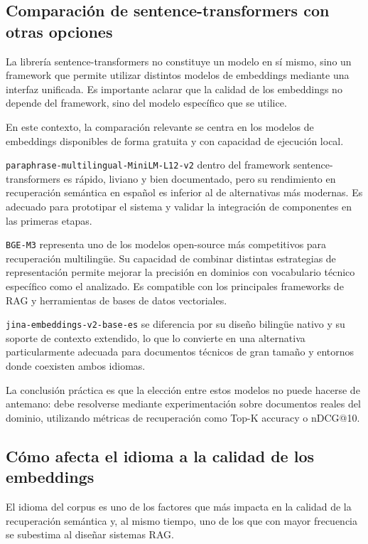 \documentclass[12pt, a4paper]{report}
\begin{document}
\subsection*{Comparación de sentence-transformers con otras opciones}

La librería sentence-transformers no constituye un modelo en sí mismo, sino un framework que permite utilizar distintos modelos de embeddings mediante una interfaz unificada. Es importante aclarar que la calidad de los embeddings no depende del framework, sino del modelo específico que se utilice.

En este contexto, la comparación relevante se centra en los modelos de embeddings disponibles de forma gratuita y con capacidad de ejecución local.

\texttt{paraphrase-multilingual-MiniLM-L12-v2} dentro del framework sentence-transformers es rápido, liviano y bien documentado, pero su rendimiento en recuperación semántica en español es inferior al de alternativas más modernas. Es adecuado para prototipar el sistema y validar la integración de componentes en las primeras etapas.

\texttt{BGE-M3} representa uno de los modelos open-source más competitivos para recuperación multilingüe. Su capacidad de combinar distintas estrategias de representación permite mejorar la precisión en dominios con vocabulario técnico específico como el analizado. Es compatible con los principales frameworks de RAG y herramientas de bases de datos vectoriales.

\texttt{jina-embeddings-v2-base-es} se diferencia por su diseño bilingüe nativo y su soporte de contexto extendido, lo que lo convierte en una alternativa particularmente adecuada para documentos técnicos de gran tamaño y entornos donde coexisten ambos idiomas.

La conclusión práctica es que la elección entre estos modelos no puede hacerse de antemano: debe resolverse mediante experimentación sobre documentos reales del dominio, utilizando métricas de recuperación como Top-K accuracy o nDCG@10.

\subsection*{Cómo afecta el idioma a la calidad de los embeddings}

El idioma del corpus es uno de los factores que más impacta en la calidad de la recuperación semántica y, al mismo tiempo, uno de los que con mayor frecuencia se subestima al diseñar sistemas RAG.
\end{document}
